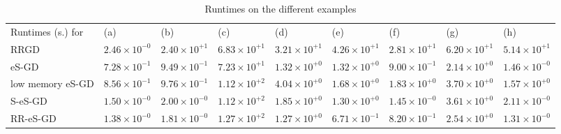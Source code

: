 \documentclass[article,authoryear,jmlmc]{beg_32}             %
\begin{document}
\begin{table}[h!]
	\caption{Runtimes on the different examples}
        \hspace{-3cm}\begin{tabular}{lllllllll}
          Runtimes (s.) for & (a)                &  (b)              & (c)              & (d)               & (e)               & (f)               & (g)                  & (h)\\ 
          RRGD           & $2.46 \times 10^{-0}$ & $2.40\times 10^{+1}$  & $6.83 \times 10^{+1}$ & $3.21 \times 10^{+1}$ & $4.26 \times 10^{+1}$ & $2.81\times 10^{+1}$& $6.20 \times
          10^{+1}$ & $5.14\times 10^{+1}$ \\ 
          eS-GD         & $7.28 \times 10^{-1}$ & $9.49\times 10^{-1}$  & $7.23 \times 10^{+1}$ & $1.32 \times 10^{+0}$ & $1.32 \times 10^{+0}$ & $9.00\times 10^{-1}$& $2.14 \times  10^{+0}$ & $1.46\times 10^{-0}$ \\ 
          low memory eS-GD   & $8.56 \times 10^{-1}$ & $9.76\times 10^{-1}$  & $1.12 \times 10^{+2}$ & $4.04 \times 10^{+0}$ & $1.68 \times 10^{+0}$ & $1.83\times 10^{+0}$& $3.70 \times 10^{+0}$ & $1.57\times 10^{+0}$\\ 
      S-eS-GD         & $1.50 \times 10^{-0}$ & $2.00\times 10^{-0}$  & $1.12 \times 10^{+2}$ & $1.85 \times 10^{+0}$ & $1.30 \times 10^{+0}$ & $1.45\times 10^{-0}$& $3.61 \times  10^{+0}$ & $2.11\times 10^{-0}$ \\ 
     RR-eS-GD         & $1.38 \times 10^{-0}$ & $1.81\times 10^{-0}$  & $1.27 \times 10^{+2}$ & $1.27 \times 10^{+0}$ & $6.71 \times 10^{-1}$ & $8.20\times 10^{-1}$& $2.54 \times 10^{+0}$ & $1.31\times 10^{-0}$ \\ 

	\end{tabular}
	\label{ex1_example}
\end{table}
\end{document}
